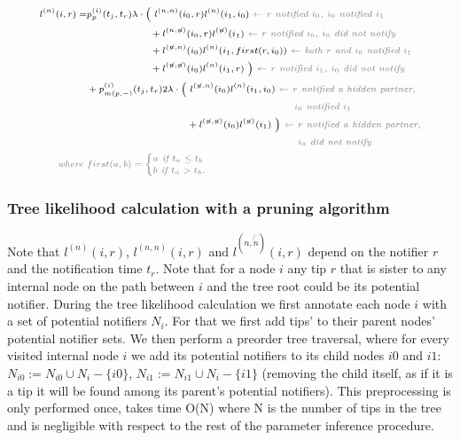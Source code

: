 \documentclass[10pt,letterpaper]{article}
\begin{document}
\begin{equation}
\scriptsize
\begin{split}
l^{(n)}(i, r) = &p_{p}^{(i)}(t_j,t_r) \lambda \cdot
\Big(~l^{(n,n)}(i_0,r)l^{(n)}(i_1,i_0) \textit{\color{gray}~$\leftarrow$ $r$ notified $i_0$, $i_0$  notified $i_1$} \\
&~~~~~~~~~~~~~~~~~~~+ l^{(n,\not{n})}(i_0,r)l^{(\not{n})}(i_1) \textit{\color{gray}~$\leftarrow$  $r$ notified $i_0$, $i_0$ did not notify} \\
&~~~~~~~~~~~~~~~~~~~+l^{(\not{n}, n)}(i_0)l^{(n)}(i_1,first(r,i_0)) \textit{\color{gray}~$\leftarrow$ both $r$ and $i_0$ notified $i_1$} \\
&~~~~~~~~~~~~~~~~~~~+ l^{(\not{n},\not{n})}(i_0)l^{(n)}(i_1,r)~\Big) \textit{\color{gray}~$\leftarrow$ $r$ notified $i_1$, $i_0$ did not notify} 
\\
&+ p_{m(p,-)}^{(i)}(t_j,t_r) 2\lambda \cdot
\Big(~l^{(\not{n},n)}(i_0)l^{(n)}(i_1,i_0) \textit{\color{gray}~$\leftarrow$ $r$ notified a hidden partner,} \\
&\textit{\color{gray}~~~~~~~~~~~~~~~~~~~~~~~~~~~~~~~~~~~~~~~~~~~~~~~~~~~~~~~~$i_0$ notified $i_1$} \\
&~~~~~~~~~~~~~~~~~~~~~~~~~~~~~~+ l^{(\not{n},\not{n})}(i_0)l^{(\not{n})}(i_1)~\Big) \textit{\color{gray}~$\leftarrow$ $r$ notified a hidden partner,} \\
&\textit{\color{gray}~~~~~~~~~~~~~~~~~~~~~~~~~~~~~~~~~~~~~~~~~~~~~~~~~~~~~~~~ $i_0$ did not notify}\\
\textit{\color{gray}~where } &\color{gray}first(a,b) = 
\begin{cases}
a \textit{~if $t_a \leq t_b$}\\
b \textit{~if $t_a > t_b$.}
\end{cases} 
 \end{split}
\label{eq:lp-tip-int}
\end{equation}

\subsubsection*{Tree likelihood calculation with a pruning algorithm} 
Note that $l^{(n)}(i, r)$, $l^{(n,n)}(i, r)$ and $l^{(n,\not{n})}(i, r)$ depend on the notifier $r$ and the notification time $t_r$. Note that for a node $i$ any tip $r$ that is sister to any internal node on the path between $i$ and the tree root could be its potential notifier. During the tree likelihood calculation we first annotate each node $i$ with a set of potential notifiers $N_i$. For that we first add tips' to their parent nodes'  potential notifier sets. We then perform a preorder tree traversal, where for every visited internal node $i$ we add its potential notifiers to its child nodes $i0$ and $i1$: $N_{i0} := N_{i0} \cup N_i - \{i0\}$, $N_{i1} := N_{i1} \cup N_i - \{i1\}$ (removing the child itself, as if it is a tip it will be found among its parent's potential notifiers). This preprocessing is only performed once, takes time O(N) where N is the number of tips in the tree and is negligible with respect to the rest of the parameter inference procedure. 
\end{document}
